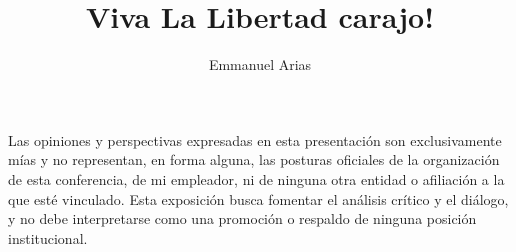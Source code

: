\documentclass{beamer}
\title{Viva La Libertad carajo!}
\author{Emmanuel Arias}
\begin{document}
\begin{frame}[plain]
    \maketitle
\end{frame}

\begin{frame}
  \centering
  Las opiniones y perspectivas expresadas en esta presentación son exclusivamente mías y no representan, en forma alguna, las posturas oficiales de la organización de esta conferencia, de mi empleador, ni de ninguna otra entidad o afiliación a la que esté vinculado. Esta exposición busca fomentar el análisis crítico y el diálogo, y no debe interpretarse como una promoción o respaldo de ninguna posición institucional.
\end{frame}
\end{document}
